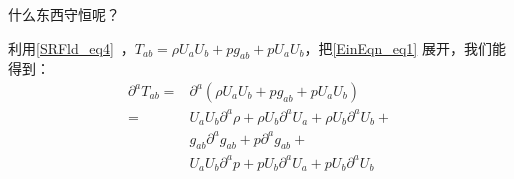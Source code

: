 什么东西守恒呢？

利用\autoref{SRFld_eq4}~，$T_{ab}=\rho U_aU_b+p g_{ab}+p U_aU_b$，把\autoref{EinEqn_eq1} 展开，我们能得到：
\begin{equation}
\begin{aligned}
\partial^aT_{ab}=&\partial^a(\rho U_aU_b+p g_{ab}+p U_aU_b)\\
=&U_aU_b\partial^a\rho+\rho U_b\partial^aU_a+\rho U_b\partial^aU_b+\\
&g_{ab}\partial^ag_{ab}+p\partial^ag_{ab}+\\
&U_aU_b\partial^ap+p U_b\partial^aU_a+p U_b\partial^aU_b
\end{aligned}
\end{equation}













